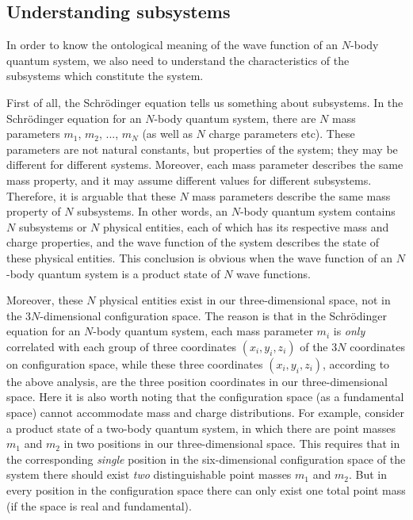 \subsection{Understanding subsystems}

In order to know the ontological meaning of the wave function of an $N$-body quantum system, we also need to understand the characteristics of the subsystems which constitute the  system.

First of all, the Schr\"{o}dinger equation tells us something about subsystems. In the Schr\"{o}dinger equation for an $N$-body quantum system, there are $N$ mass parameters $m_1$, $m_2$,  ..., $m_N$ (as well as $N$ charge parameters etc). These parameters are not natural constants, but properties of the system; they may be different for different systems. Moreover, each mass parameter describes the same mass property, and it may assume different values for different subsystems. Therefore, it is arguable that these $N$ mass parameters describe the same mass property of $N$ subsystems. In other words, an $N$-body quantum system contains $N$ subsystems or $N$ physical entities, each of which has its respective mass and charge properties, and the wave function of the system describes the state of these physical entities. This conclusion is obvious when the wave function of an $N$-body quantum system is a product state of $N$ wave functions. 

Moreover, these $N$ physical entities exist in our three-dimensional space, not in the $3N$-dimensional configuration space. The reason is that in the Schr\"{o}dinger equation for an $N$-body quantum system, each mass parameter $m_i$ is \emph{only} correlated with each group of three coordinates $(x_i, y_i, z_i)$ of the $3N$ coordinates on configuration space, while these three coordinates $(x_i, y_i, z_i)$, according to the above analysis, are the three position coordinates in our three-dimensional space. 
Here it is also worth noting that the configuration space (as a fundamental space) cannot accommodate mass and charge distributions. For example, consider a product state of a two-body quantum system, in which there are point masses $m_1$ and $m_2$ in two positions in our three-dimensional space. This requires that in the corresponding \emph{single} position in the six-dimensional configuration space of the system there should exist \emph{two} distinguishable point masses $m_1$ and $m_2$. But  in every position in the configuration space there can only exist one total point mass (if the space is real and fundamental).

